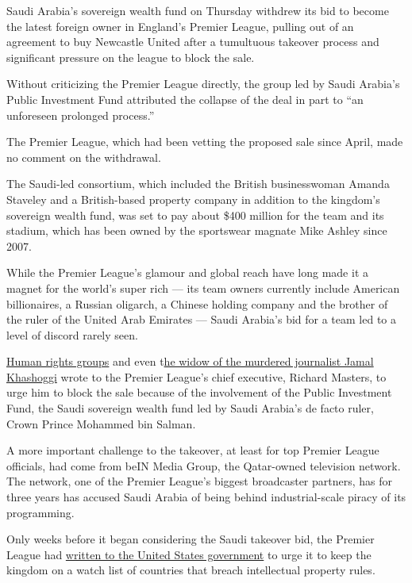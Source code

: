 Saudi Arabia's sovereign wealth fund on Thursday withdrew its bid to
become the latest foreign owner in England's Premier League, pulling out
of an agreement to buy Newcastle United after a tumultuous takeover
process and significant pressure on the league to block the sale.

Without criticizing the Premier League directly, the group led by Saudi
Arabia's Public Investment Fund attributed the collapse of the deal in
part to ``an unforeseen prolonged process.''

The Premier League, which had been vetting the proposed sale since
April, made no comment on the withdrawal.

The Saudi-led consortium, which included the British businesswoman
Amanda Staveley and a British-based property company in addition to the
kingdom's sovereign wealth fund, was set to pay about \$400 million for
the team and its stadium, which has been owned by the sportswear magnate
Mike Ashley since 2007.

While the Premier League's glamour and global reach have long made it a
magnet for the world's super rich --- its team owners currently include
American billionaires, a Russian oligarch, a Chinese holding company and
the brother of the ruler of the United Arab Emirates --- Saudi Arabia's
bid for a team led to a level of discord rarely seen.

\href{https://www.independent.co.uk/sport/football/premier-league/newcastle-takeover-human-rights-saudi-arabia-consortium-fa-disqualified-a9481361.html}{Human
rights groups} and even
t\href{https://www.theguardian.com/commentisfree/2020/may/18/saudi-regime-newcastle-united-jamal-khashoggi-mohammed-bin-salman}{he
widow of the murdered journalist Jamal Khashoggi} wrote to the Premier
League's chief executive, Richard Masters, to urge him to block the sale
because of the involvement of the Public Investment Fund, the Saudi
sovereign wealth fund led by Saudi Arabia's de facto ruler, Crown Prince
Mohammed bin Salman.

A more important challenge to the takeover, at least for top Premier
League officials, had come from beIN Media Group, the Qatar-owned
television network. The network, one of the Premier League's biggest
broadcaster partners, has for three years has accused Saudi Arabia of
being behind industrial-scale piracy of its programming.

Only weeks before it began considering the Saudi takeover bid, the
Premier League had
\href{https://www.nytimes3xbfgragh.onion/2020/04/30/sports/premier-league-saudi-arabia.html}{written
to the United States government} to urge it to keep the kingdom on a
watch list of countries that breach intellectual property rules.

